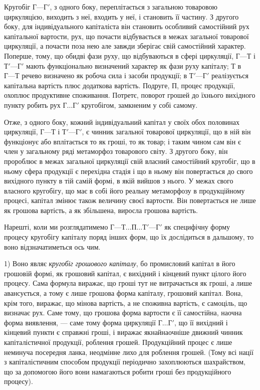 Кругобіг $Г — Г'$, з одного боку, переплітається з загальною товаровою
циркуляцією, виходить з неї, входить у неї, і становить її частину. З другого
боку, для індивідуального капіталіста він становить особливий самостійний
рух капітальної вартости, рух, що почасти відбувається в межах загальної
товарової циркуляції, а почасти поза нею але завжди зберігає свій самостійний
характер. Поперше, тому, що обидві фази руху, що відбуваються
в сфері циркуляції, $Г — Т$ і $Т' — Г'$ мають функціонально визначений
характер як фази руху капіталу; $Т$ в $Г — Т$ речево визначено як
робоча сила і засоби продукції; в $Т' — Г'$ реалізується капітальна вартість
плюс додаткова вартість. Подруге, $П$, процес продукції, охоплює продуктивне
споживання. Потретє, поворот грошей до їхнього вихідного пункту
робить рух $Г\dots{} Г'$ кругобігом, замкненим у собі самому.

Отже, з одного боку, кожний індивідуальний капітал у своїх обох
половинах циркуляції, $Г — Т$ і $Т' — Г'$, є чинник загальної товарової
циркуляції, що в ній він функціонує або вплітається то як гроші, то як
товар; і таким чином сам він є член у загальному ряді метаморфоз товарового
світу. З другого боку, він пророблює в межах загальної циркуляції свій
власний самостійний кругобіг, що в ньому сфера продукції є перехідна
стадія і що в ньому він повертається до свого вихідного пункту в тій
самій формі, в якій вийшов з нього. У межах свого власного кругобігу,
що має в собі його реальну метаморфозу в продукційному процесі,
капітал змінює також величину своєї вартости. Він повертається не лише
як грошова вартість, а як збільшена, виросла грошова вартість.

Нарешті, коли ми розглядатимемо $Г — Т\dots{} П\dots{} Т' — Г'$ як специфічну
форму процесу кругобігу капіталу поряд інших форм, що їх дослідиться
в дальшому, то воно відзначатиметься ось чим.

1) Воно являє \emph{кругобіг грошового капіталу}, бо промисловий капітал
в його грошовій формі, як грошовий капітал, є вихідний і кінцевий
пункт цілого його процесу. Сама формула виражає, що гроші тут не
витрачається як гроші, а лише авансується, а тому є лише грошова
форма капіталу, грошовий капітал. Вона, крім того, виражає, що мінова
вартість, а не споживна вартість, є самоціль, що визначає рух. Саме тому,
що грошова форма вартости є її самостійна, наочна форма виявлення, —
саме тому форма циркуляції $Г\dots{} Г'$, що її вихідний і кінцевий
пункти є справжні гроші, і виражає якнайнаочніше движний чинник
капіталістичної продукції, роблення грошей. Продукційний процес
є лише неминуча посередня ланка, неодмінне лихо для роблення грошей.
(Тому всі нації з капіталістичним способом продукції періодично захоплюються
шахрайством, що за допомогою його вони намагаються робити
гроші без продукційного процесу).

